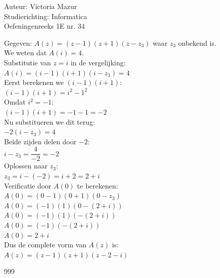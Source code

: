 \documentclass[a4paper]{article}
\begin{document}
  
\noindent \large Auteur: Victoria Mazur \\
\noindent \large Studierichting: Informatica\\
\noindent \large Oefeningenreeks 1E nr. 34\\

\medskip

\normalsize

Gegeven: $A(z) = (z - 1)(z + 1)(z - z_3)$ waar $z_3$ onbekend is. \\

We weten dat $A(i) = 4$. \\

Substitutie van $z = i$ in de vergelijking: \\

$A(i) = (i - 1)(i + 1)(i - z_3) = 4$ \\

Eerst berekenen we $(i - 1)(i + 1)$: \\

$(i - 1)(i + 1) = i^2 - 1^2$ \\

Omdat $i^2 = -1$: \\

$(i - 1)(i + 1) = -1 - 1 = -2$ \\

Nu substitueren we dit terug: \\

$-2(i - z_3) = 4$ \\

Beide zijden delen door $-2$: \\

$i - z_3 = \dfrac{4}{-2} = -2$ \\

Oplossen naar $z_3$: \\

$z_3 = i - (-2) = i + 2 = 2 + i$ \\

Verificatie door $A(0)$ te berekenen: \\

$A(0) = (0 - 1)(0 + 1)(0 - z_3)$ \\

$A(0) = (-1)(1)(0 - (2 + i))$ \\

$A(0) = (-1)(1)(-(2 + i))$ \\

$A(0) = (-1)(-(2 + i))$ \\

$A(0) = 2 + i$ \\

Dus de complete vorm van $A(z)$ is: \\

$A(z) = (z - 1)(z + 1)(z - 2 - i)$ \\

\begin{thebibliography}{999}
\end{thebibliography}
\end{document}
